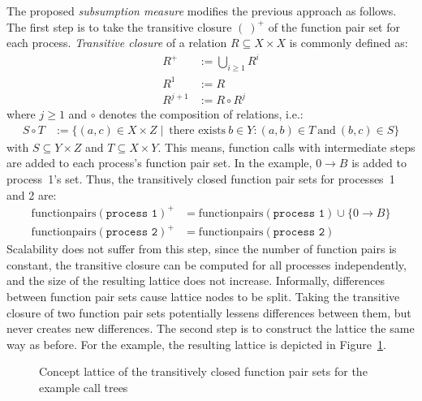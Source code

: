\documentclass[a4paper, final, diplominf]{zih-template}
\begin{document}
The proposed \emph{subsumption measure} modifies the previous approach as follows.
The first step is to take the transitive closure $(~)^+$ of the function pair set for each process.
\emph{Transitive closure} of a relation $R \subseteq X \times X$ is commonly defined as:
\begin{equation*}
	\begin{aligned}
		R^+ & := \bigcup_{i \ge 1} R^i \\
		R^1 & := R \\
		R^{j+1} & := R \circ R^j
	\end{aligned}
\end{equation*}
where $j \ge 1$ and $\circ$ denotes the composition of relations, i.e.:
\begin{equation*}
	\begin{aligned}
		S \circ T & := \big\{ (a, c) \in X \times Z \mid ~\text{there exists}~ b \in Y : (a, b) \in T ~\text{and}~ (b, c) \in S \big\}
	\end{aligned}
\end{equation*}
with $S \subseteq Y \times Z$ and $T \subseteq X \times Y$.
This means, function calls with intermediate steps are added to each process's function pair set.
In the example, $0 \rightarrow B$ is added to process~1's set.
Thus, the transitively closed function pair sets for processes~1 and 2 are:
\begin{equation*}
	\begin{aligned}
		\text{functionpairs}(\texttt{process 1})^+ & = \text{functionpairs}(\texttt{process 1}) \cup \{ 0 \rightarrow B \} \\
		\text{functionpairs}(\texttt{process 2})^+ & = \text{functionpairs}(\texttt{process 2})
	\end{aligned}
\end{equation*}
Scalability does not suffer from this step, since the number of function pairs is constant, the transitive closure can be computed for all processes independently, and the size of the resulting lattice does not increase.
Informally, differences between function pair sets cause lattice nodes to be split.
Taking the transitive closure of two function pair sets potentially lessens differences between them, but never creates new differences.
The second step is to construct the lattice the same way as before.
For the example, the resulting lattice is depicted in Figure~\ref{fig:subsumption-example-transitive-concept-lattice}.
\begin{figure}[tb]
	\centering
	
	\caption{Concept lattice of the transitively closed function pair sets for the example call trees}
	\label{fig:subsumption-example-transitive-concept-lattice}
\end{figure}
\end{document}
